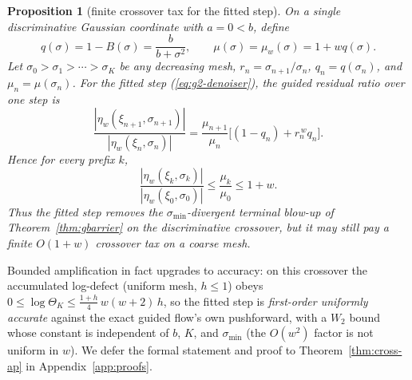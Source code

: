 \documentclass{article} %
\def\eqref#1{equation~\ref{#1}}
\theoremstyle{plain}
\newtheorem{proposition}{Proposition}
\theoremstyle{definition}
\theoremstyle{remark}
\providecommand{\smin}{\sigma_{\min}}
\providecommand{\etaw}{\eta_{w}}
\def\eqref#1{(\ref{#1})}
\newif\ifarxiv
\begin{document}
\begin{proposition}[finite crossover tax for the fitted step]\label{prop:g2-crossover-tax}
On a single discriminative Gaussian coordinate with $a=0<b$, define
\[
  q(\sigma)=1-B(\sigma)=\frac{b}{b+\sigma^2},\qquad
  \mu(\sigma)=\mu_w(\sigma)=1+wq(\sigma).
\]
Let $\sigma_0>\sigma_1>\cdots>\sigma_K$ be any decreasing mesh,
$r_n=\sigma_{n+1}/\sigma_n$, $q_n=q(\sigma_n)$, and
$\mu_n=\mu(\sigma_n)$.  For the fitted step \eqref{eq:g2-denoiser}, the
guided residual ratio over one step is
\begin{equation}\label{eq:g2-crossover-ratio}
  \frac{|\etaw(\xi_{n+1},\sigma_{n+1})|}
       {|\etaw(\xi_n,\sigma_n)|}
  =
  \frac{\mu_{n+1}}{\mu_n}
  \bigl[(1-q_n)+r_n^{\,w}q_n\bigr].
\end{equation}
Hence for every prefix $k$,
\begin{equation}\label{eq:g2-finite-tax}
  \frac{|\etaw(\xi_k,\sigma_k)|}
       {|\etaw(\xi_0,\sigma_0)|}
  \le
  \frac{\mu_k}{\mu_0}
  \le 1+w .
\end{equation}
Thus the fitted step removes the $\smin$-divergent terminal blow-up of
Theorem~\ref{thm:gbarrier} on the discriminative crossover, but it may still
pay a finite $O(1+w)$ crossover tax on a coarse mesh.
\end{proposition}

\newcommand{\ProofGTwoTax}{%
For $a=0$, $A\equiv1$ and $q=1-B$.  The decomposition
\eqref{eq:gfit-decomp} gives the coordinate factor
\[
  G_{\rm fit}
  = r_nB_n+r_n^{1+w}(1-B_n)
  = r_n\bigl[(1-q_n)+r_n^{\,w}q_n\bigr].
\]
Since $\etaw=\mu(\sigma)\xi/\sigma$, the residual ratio is
$(\mu_{n+1}/\mu_n)(G_{\rm fit}/r_n)$, which is
\eqref{eq:g2-crossover-ratio}.  The bracket is at most $1$ because
$0\le q_n\le1$ and $0<r_n^w\le1$, so products telescope:
\[
  \prod_{n=0}^{k-1}
  \frac{|\etaw(\xi_{n+1},\sigma_{n+1})|}
       {|\etaw(\xi_n,\sigma_n)|}
  \le
  \prod_{n=0}^{k-1}\frac{\mu_{n+1}}{\mu_n}
  =
  \frac{\mu_k}{\mu_0}
  \le 1+w .
\]
}
\ifarxiv\begin{proof}\ProofGTwoTax\end{proof}\fi

Bounded amplification in fact upgrades to accuracy: on this crossover the
accumulated log-defect (uniform mesh, $h\le1$) obeys
$0\le\log\Theta_K\le\tfrac{1+h}{4}\,w(w+2)\,h$, so the
fitted step is \emph{first-order uniformly accurate} against the exact guided
flow's own pushforward, with a $W_2$ bound whose constant is independent of $b$,
$K$, and $\smin$ (the $O(w^2)$ factor is not uniform in $w$).  We defer the
formal statement and proof to Theorem~\ref{thm:cross-ap} in
Appendix~\ref{app:proofs}.
\end{document}
